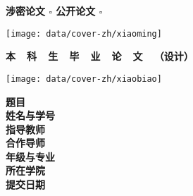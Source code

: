 {
  \setlength{\parindent}{0em}

  {
      \songti\wuhao\bfseries
      \vspace*{-3em}
      \hfill 涉密论文\; $\square$ \;\; 公开论文\; $\square$ \;\;
      \vspace*{4em}
  }
  {
    \linespread{1}

    \vspace*{-1em}

    \begin{center}
      \texttt{[image: data/cover-zh/xiaoming]}
    \end{center}

    \vspace{0.5em}

    {
      \heiti\yihao\bfseries
      \centering
      本~~科~~生~~毕~~业~~论~~文~~（设计） \par
    }

    \vspace{1em}

    \begin{center}
      \texttt{[image: data/cover-zh/xiaobiao]}
    \end{center}
  }

  \vspace{0em}

  {
    \linespread{1.6}
    \stfangsong\sanhao\bfseries
    \newlength{\titlelength}
    \setlength{\titlelength}{22em}
    \hspace*{5em} 题目 \underline{\makebox[17em]{\zjutitlec}} \vspace{4em}\\
    \hspace*{5em} 姓名与学号 \underline{\makebox[11.5em]{\zjuauthornamec \zjuauthorid}} \\
    \hspace*{5em} 指导教师 \underline{\makebox[12.5em]{\zjumentorc}} \\
    \hspace*{5em} 合作导师 \underline{\makebox[12.5em]{\zjucomentorc}} \\
    \hspace*{5em} 年级与专业 \underline{\makebox[11.5em]{\zjugrade \  \zjumajorc}} \\
    \hspace*{5em} 所在学院 \underline{\makebox[12.5em]{\zjucollegec}} \vspace{2em}\\
    \hspace*{5em} 提交日期 \; \underline{\makebox[12.5em]{\zjudatec}} \par
  }
}
